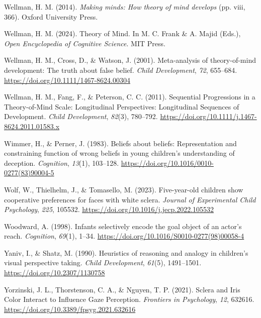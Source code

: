\documentclass[
]{scrbook}
\newlength{\cslhangindent}
\newenvironment{CSLReferences}[2] %
 {\begin{list}{}{%
  \setlength{\itemindent}{0pt}
  \setlength{\leftmargin}{0pt}
  \setlength{\parsep}{0pt}
  \ifodd #1
   \setlength{\leftmargin}{\cslhangindent}
   \setlength{\itemindent}{-1\cslhangindent}
  \fi
  \setlength{\itemsep}{#2\baselineskip}}}
 {\end{list}}
\begin{document}
\begin{CSLReferences}{1}{0}
Wellman, H. M. (2014). \emph{Making minds: {How} theory of mind develops} (pp. viii, 366). Oxford University Press.

Wellman, H. M. (2024). Theory of {Mind}. In M. C. Frank \& A. Majid (Eds.), \emph{Open {Encyclopedia} of {Cognitive Science}}. MIT Press.

Wellman, H. M., Cross, D., \& Watson, J. (2001). Meta-analysis of theory-of-mind development: {The} truth about false belief. \emph{Child Development}, \emph{72}, 655--684. \url{https://doi.org/10.1111/1467-8624.00304}

Wellman, H. M., Fang, F., \& Peterson, C. C. (2011). Sequential {Progressions} in a {Theory-of-Mind Scale}: {Longitudinal Perspectives}: {Longitudinal Sequences} of {Development}. \emph{Child Development}, \emph{82}(3), 780--792. \url{https://doi.org/10.1111/j.1467-8624.2011.01583.x}

Wimmer, H., \& Perner, J. (1983). Beliefs about beliefs: {Representation} and constraining function of wrong beliefs in young children's understanding of deception. \emph{Cognition}, \emph{13}(1), 103--128. \url{https://doi.org/10.1016/0010-0277(83)90004-5}

Wolf, W., Thielhelm, J., \& Tomasello, M. (2023). Five-year-old children show cooperative preferences for faces with white sclera. \emph{Journal of Experimental Child Psychology}, \emph{225}, 105532. \url{https://doi.org/10.1016/j.jecp.2022.105532}

Woodward, A. (1998). Infants selectively encode the goal object of an actor's reach. \emph{Cognition}, \emph{69}(1), 1--34. \url{https://doi.org/10.1016/S0010-0277(98)00058-4}

Yaniv, I., \& Shatz, M. (1990). Heuristics of reasoning and analogy in children's visual perspective taking. \emph{Child Development}, \emph{61}(5), 1491--1501. \url{https://doi.org/10.2307/1130758}

Yorzinski, J. L., Thorstenson, C. A., \& Nguyen, T. P. (2021). Sclera and {Iris Color Interact} to {Influence Gaze Perception}. \emph{Frontiers in Psychology}, \emph{12}, 632616. \url{https://doi.org/10.3389/fpsyg.2021.632616}


\end{CSLReferences}
\end{document}
